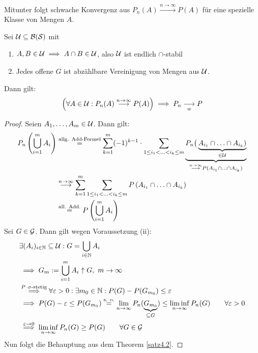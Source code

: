 Mitunter folgt schwache Konvergenz aus $P_n(A)\stackrel{n\to\infty}{\longrightarrow} P(A)$ für eine spezielle Klasse von Mengen $A$.

\begin{theorem}\label{theorem4.3}
Sei $\mathcal{U}\subseteq\mathcal{B}(\mathcal{S})$ mit
\begin{enumerate}[label=(\roman*)]
\item $\begin{aligned}
A,B\in \mathcal{U}\implies A\cap B\in\mathcal{U}
\end{aligned}$, also $\mathcal{U}$ ist endlich $\cap$-stabil
\item Jedes offene $G$ ist abzählbare Vereinigung von Mengen aus $\mathcal{U}$.
\end{enumerate}
Dann gilt:
\begin{align*}
\Big(\forall A\in\mathcal{U}:P_n(A)\stackrel{n\to\infty}{\longrightarrow} P(A)\Big)\implies P_n\underset{w}{\overset{}{\longrightarrow}} P
\end{align*}
\end{theorem}

\begin{proof}
Seien $A_1,\ldots,A_m\in\mathcal{U}$. Dann gilt:
\begin{align*}
P_n\left(\bigcup\limits_{i=1}^m A_i\right)
&\stackrel{\text{allg. Add-Formel}}{=}
\sum\limits_{k=1}^m (-1)^{k-1}\cdot\sum\limits_{1\leq i_1<\ldots<i_k\leq m}\underbrace{P_n\big(\underbrace{A_{i_1}\cap\ldots\cap A_{i_k})}_{\in\mathcal{U}}}_{\stackrel{n\to\infty}{\longrightarrow} P(A_{i_1}\cap\ldots\cap A_{i_k})}\\
&\stackrel{n\to\infty}{\longrightarrow}
\sum\limits_{k=1}^m\sum\limits_{1\leq i_1<\ldots<i_k\leq m} P\left(A_{i_1}\cap\ldots\cap A_{i_k}\right)\\
&\stackrel{\text{all. Add.}}{=}
P\left(\bigcup\limits_{i=1}^m A_i\right)
\end{align*}
Sei $G\in\mathcal{G}$. Dann gilt wegen Voraussetzung (ii):
\begin{align*}
&\exists(A_i)_{i\in\mathbb{N}}\subseteq\mathcal{U}:G=\bigcup\limits_{i\in\mathbb{N}} A_i\\
&\implies
G_m:=\bigcup\limits_{i=1}^m A_i\uparrow G,~m\to\infty\\
&\stackrel{P~\sigma\text{-stetig}}{\implies}
\forall \varepsilon>0:\exists m_0\in\mathbb{N}:P(G)-P(G_{m_0})\leq\varepsilon\\
&\implies
P(G)-\varepsilon\leq P(G_{m_0})
\stackrel{\text{s. o.}}{=}
\lim\limits_{n\to\infty} P_n(\underbrace{G_{m_0}}_{\subseteq G})\leq\liminf\limits_{n\to\infty} P_n(G)\qquad\forall\varepsilon>0\\
&\stackrel{\varepsilon\to0}{\implies}
\liminf\limits_{n\to\infty} P_n(G)\geq P(G)\qquad\forall G\in\mathcal{G}
\end{align*}
Nun folgt die Behauptung aus dem Theorem \ref{satz4.2}.
\end{proof}

